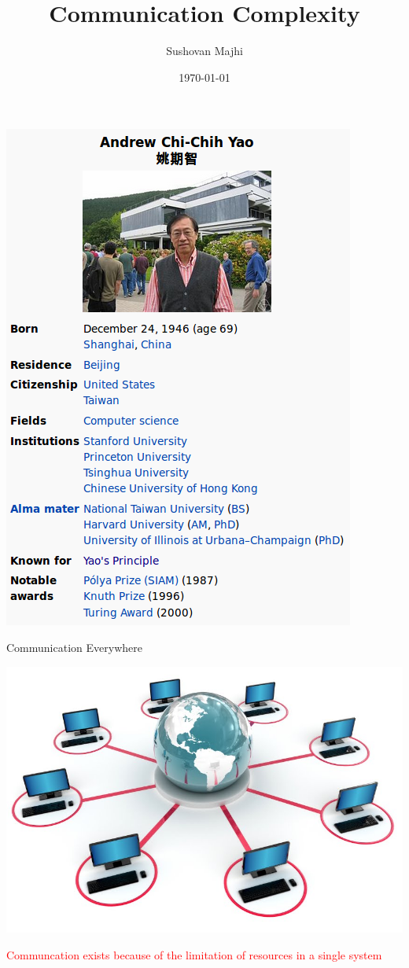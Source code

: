 \documentclass[9pt]{beamer}
\begin{document}
\title{Communication Complexity} 
\author{Sushovan Majhi}
\date{\today} 

\frame{\titlepage} 
\begin{frame}
  \begin{center}
    \includegraphics[scale=0.4]{yao.png}
  \end{center}
\end{frame}

\begin{frame}{Communication Everywhere}
  \begin{center}
    \includegraphics[scale=0.2]{network.jpg}
  \end{center}
  \textcolor{red}{Communcation exists because of the limitation of resources in a 
    single system}
\end{frame}
\end{document}
